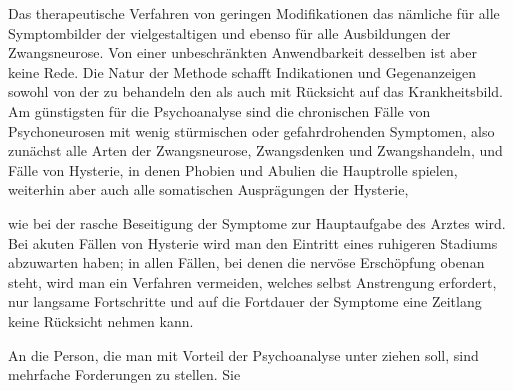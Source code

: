 \documentclass[twoside=true,titlepage=false,open=any, parskip=never, fontsize=10pt, headings=small, chapterprefix=false, appendixprefix=false]{scrbook}
\begin{document}
        \pstart
        Das therapeutische Verfahren  von geringen Modifikationen
 das nämliche für alle Symptombilder der vielgestaltigen
 und ebenso für alle Ausbildungen
               der Zwangsneurose.
 Von einer
               unbeschränkten Anwendbarkeit desselben ist aber keine
 Rede. Die Natur der  Methode schafft Indikationen und Gegenanzeigen sowohl von  der zu behandeln
den  als auch mit Rücksicht auf das Krankheitsbild. Am
 günstigsten für die
               Psychoanalyse sind die chronischen Fälle von
 Psychoneurosen mit wenig
               stürmischen oder gefahrdrohenden
 Symptomen, also zunächst alle Arten der
               Zwangsneurose,
 Zwangsdenken und Zwangshandeln, und Fälle von Hysterie, in
               denen Phobien und Abulien  die
               Hauptrolle spielen, weiterhin
 aber auch alle somatischen Ausprägungen der
               Hysterie, 

 wie bei der  rasche Beseitigung der Symptome
 zur Hauptaufgabe des Arztes wird. Bei
               akuten Fällen von Hysterie
 wird man den Eintritt eines ruhigeren Stadiums
               abzuwarten
 haben; in allen Fällen, bei denen die nervöse Erschöpfung obenan
               steht, wird man ein Verfahren vermeiden, welches selbst Anstrengung
 erfordert,
               nur langsame Fortschritte  und auf die Fortdauer
 der Symptome eine Zeitlang keine Rücksicht nehmen
               kann.
        \pend
    



        \pstart
        An die Person, die man mit Vorteil der Psychoanalyse unter
ziehen
               soll, sind mehrfache Forderungen zu stellen. Sie 
\end{document}

